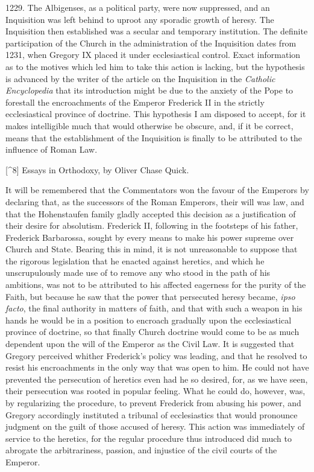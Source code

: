 \documentclass{book}
\begin{document}
1229. The Albigenses, as a political party, were now suppressed, and an Inquisition was left behind to uproot any sporadic growth of heresy. The Inquisition then established was a secular and temporary institution. The definite participation of the Church in the administration of the Inquisition dates from 1231, when Gregory IX placed it under ecclesiastical control. Exact information as to the motives which led him to take this action is lacking, but the hypothesis is advanced by the writer of the article on the Inquisition in the \emph{Catholic Encyclopedia} that its introduction might be due to the anxiety of the Pope to forestall the encroachments of the Emperor Frederick II in the strictly ecclesiastical province of doctrine. This hypothesis I am disposed to accept, for it makes intelligible much that would otherwise be obscure, and, if it be correct, means that the establishment of the Inquisition is finally to be attributed to the influence of Roman Law.

{[}\textasciicircum{}8{]} Essays in Orthodoxy, by Oliver Chase Quick.

It will be remembered that the Commentators won the favour of the Emperors by declaring that, as the successors of the Roman Emperors, their will was law, and that the Hohenstaufen family gladly accepted this decision as a justification of their desire for absolutism. Frederick II, following in the footsteps of his father, Frederick Barbarossa, sought by every means to make his power supreme over Church and State. Bearing this in mind, it is not unreasonable to suppose that the rigorous legislation that he enacted against heretics, and which he unscrupulously made use of to remove any who stood in the path of his ambitions, was not to be attributed to his affected eagerness for the purity of the Faith, but because he saw that the power that persecuted heresy became, \emph{ipso facto}, the final authority in matters of faith, and that with such a weapon in his hands he would be in a position to encroach gradually upon the ecclesiastical province of doctrine, so that finally Church doctrine would come to be as much dependent upon the will of the Emperor as the Civil Law. It is suggested that Gregory perceived whither Frederick’s policy was leading, and that he resolved to resist his encroachments in the only way that was open to him. He could not have prevented the persecution of heretics even had he so desired, for, as we have seen, their persecution was rooted in popular feeling. What he could do, however, was, by regularizing the procedure, to prevent Frederick from abusing his power, and Gregory accordingly instituted a tribunal of ecclesiastics that would pronounce judgment on the guilt of those accused of heresy. This action was immediately of service to the heretics, for the regular procedure thus introduced did much to abrogate the arbitrariness, passion, and injustice of the civil courts of the Emperor.
\end{document}
